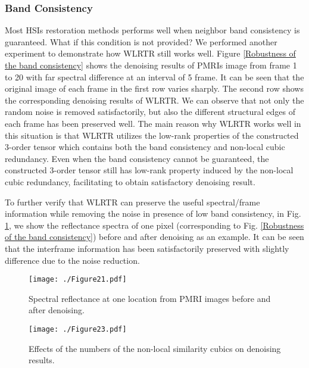 \documentclass[twocolumn]{svjour3}          %
\begin{document}
  \subsubsection{\textbf{Band Consistency}}
    Most HSIs restoration methods performs well when neighbor band consistency is guaranteed. What if this condition is not provided? We performed another experiment to demonstrate how WLRTR still works well. Figure \ref{Robustness of the band consistency} shows the denoising results of PMRIs image from frame 1 to 20 with far spectral difference at an interval of 5 frame. It can be seen that the original image of each frame in the first row varies sharply. The second row shows the corresponding denoising results of WLRTR. We can observe that not only the random noise is removed satisfactorily, but also the different structural edges of each frame has been preserved well. The main reason why WLRTR works well in this situation is that WLRTR utilizes the low-rank properties of the constructed 3-order tensor which contains both the band consistency and non-local cubic redundancy. Even when the band consistency cannot be guaranteed, the constructed 3-order tensor still has low-rank property induced by the non-local cubic redundancy, facilitating to obtain satisfactory denoising result.

    To further verify that WLRTR can preserve the useful spectral/frame information while removing the noise in presence of low band consistency, in Fig. \ref{Spectral reflectance}, we show the reflectance spectra of one pixel (corresponding to Fig. \ref{Robustness of the band consistency}) before and after denoising as an example. It can be seen that the interframe information has been satisfactorily preserved with slightly difference due to the noise reduction.
    
\begin{figure}
\begin{center}
    \texttt{[image: ./Figure21.pdf]}
\end{center}
   \caption{Spectral reflectance at one location from PMRI images before and after denoising.}
\label{Spectral reflectance}
\end{figure}

\begin{figure}
\begin{center}
    \texttt{[image: ./Figure23.pdf]}
\end{center}
   \caption{Effects of the numbers of the non-local similarity cubics on denoising results.}
\label{Number of non-local cubics}
\end{figure}
\end{document}
